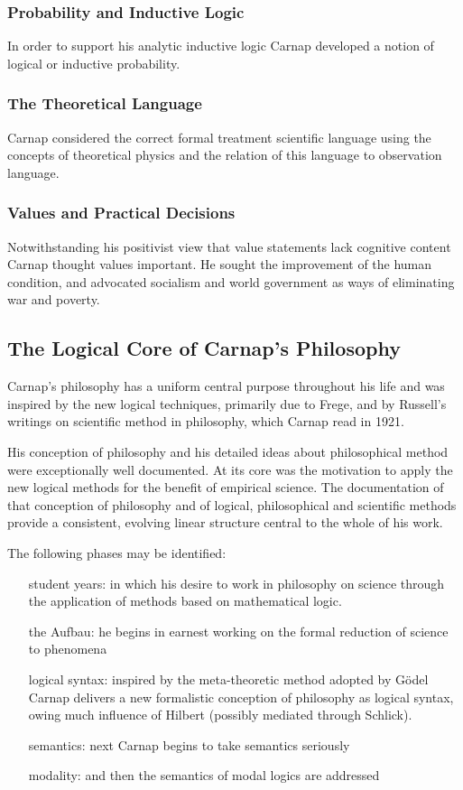 \documentclass[10pt,titlepage]{book}
\def\ouml{\"o}
\begin{document}
\subsubsection{Probability and Inductive Logic}
In order to support his analytic inductive logic Carnap developed a notion of logical or inductive probability.
\subsubsection{The Theoretical Language}
Carnap considered the correct formal treatment scientific language using the concepts of theoretical physics and the relation of this language to observation language.
\subsubsection{Values and Practical Decisions}
Notwithstanding his positivist view that value statements lack cognitive content Carnap thought values important. He sought the improvement of the human condition, and advocated socialism and world government as ways of eliminating war and poverty. 

\subsection{The Logical Core of Carnap's Philosophy}

Carnap's philosophy has a uniform central purpose throughout his life and was inspired by the new logical techniques, primarily due to Frege, and by Russell's writings on scientific method in philosophy, which Carnap read in 1921.

His conception of philosophy and his detailed ideas about philosophical method were exceptionally well documented.
At its core was the motivation to apply the new logical methods for the benefit of empirical science.
The documentation of that conception of philosophy and of logical, philosophical and scientific methods provide a consistent, evolving linear structure central to the whole of his work.

The following phases may be identified:

\begin{itemize}
\item[student years:] in which his desire to work in philosophy on science through the application of methods based on mathematical logic.
\item[the Aufbau:] he begins in earnest working on the formal reduction of science to phenomena
\item[logical syntax:] inspired by the meta-theoretic method adopted by G{\ouml}del Carnap delivers a new formalistic conception of philosophy as logical syntax, owing much influence of Hilbert (possibly mediated through Schlick).
\item[semantics:] next Carnap begins to take semantics seriously
\item[modality:] and then the semantics of modal logics are addressed
\end{itemize}
\end{document}
